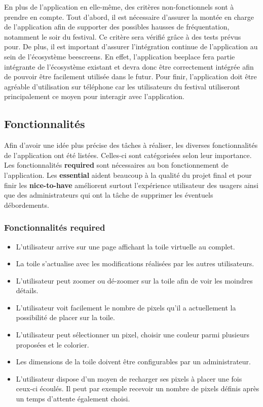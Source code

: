En plus de l'application en elle-même, des critères non-fonctionnels sont à prendre en compte. Tout d'abord, il est nécessaire d'assurer la montée en charge de l'application afin de supporter des possibles hausses de fréquentation, notamment le soir du festival. Ce critère sera vérifié grâce à des tests prévus pour. De plus, il est important d'assurer l'intégration continue de l'application au sein de l'écosystème \gls{beescreens}. En effet, l'application \gls{beeplace} fera partie intégrante de l'écosystème existant et devra donc être correctement intégrée afin de pouvoir être facilement utilisée dans le futur. Pour finir, l'application doit être agréable d'utilisation sur téléphone car les utilisateurs du festival utiliseront principalement ce moyen pour interagir avec l'application.

\subsection{Fonctionnalités}

Afin d'avoir une idée plus précise des tâches à réaliser, les diverses fonctionnalités de l'application ont été listées. Celles-ci sont catégorisées selon leur importance. Les fonctionnalités \textbf{required} sont nécessaires au bon fonctionnement de l'application. Les \textbf{essential} aident beaucoup à la qualité du projet final et pour finir les \textbf{nice-to-have} améliorent surtout l'expérience utilisateur des usagers ainsi que des administrateurs qui ont la tâche de supprimer les éventuels débordements.

\subsubsection{Fonctionnalités \guillemotleft required\guillemotright}

\begin{itemize}
  \item L'utilisateur arrive sur une page affichant la toile virtuelle au complet.
  \item La toile s'actualise avec les modifications réalisées par les autres utilisateurs.
  \item L'utilisateur peut zoomer ou dé-zoomer sur la toile afin de voir les moindres détails.
  \item L'utilisateur voit facilement le nombre de pixels qu'il a actuellement la possibilité de placer sur la toile.
  \item L'utilisateur peut sélectionner un pixel, choisir une couleur parmi plusieurs proposées et le colorier.
  \item Les dimensions de la toile doivent être configurables par un administrateur.
  \item L'utilisateur dispose d'un moyen de recharger ses pixels à placer une fois ceux-ci écoulés. Il peut par exemple recevoir un nombre de pixels définis après un temps d'attente également choisi.
\end{itemize}


